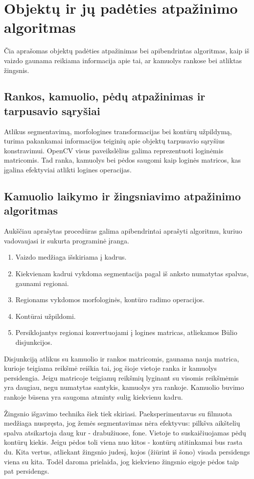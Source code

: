 \documentclass{VUMIFPSkursinis}
\begin{document}
\section{Objektų ir jų padėties atpažinimo algoritmas}
Čia aprašomas objektų padėties atpažinimas bei apibendrintas algoritmas, kaip iš vaizdo gaunama reikiama informacija apie tai, ar kamuolys rankose bei  atliktas žingsnis.
\subsection{Rankos, kamuolio, pėdų  atpažinimas ir tarpusavio sąryšiai}
Atlikus segmentavimą, morfologines transformacijas bei kontūrų užpildymą, turima pakankamai informacijos teiginių apie objektų tarpusavio sąryšius konstravimui.
OpenCV visus paveikslėlius galima reprezentuoti loginėmis matricomis. Tad ranka, kamuolys bei pėdos saugomi kaip loginės matricos, kas įgalina efektyviai atlikti logines operacijas.
\subsection{Kamuolio laikymo ir žingsniavimo atpažinimo algoritmas}
Aukščiau aprašytas procedūras galima apibendrintai aprašyti algoritmu, kuriuo vadovaujasi ir sukurta programinė įranga.
\begin{enumerate}[topsep=5pt,itemsep=-1ex,partopsep=2ex,parsep=2ex]
	\item Vaizdo medžiaga išskiriama į kadrus.  
	\item Kiekvienam kadrui vykdoma segmentacija pagal iš anksto numatytas spalvas, gaunami regionai. 
	\item Regionams vykdomos morfologinės, kontūro radimo operacijos.
	\item Kontūrai užpildomi.
	\item Persiklojantys regionai konvertuojami į logines matricas, atliekamos Būlio disjunkcijos.
\end{enumerate}

Disjunkciją atlikus su kamuolio ir rankos matricomis, gaunama nauja matrica, kurioje teigiama reikšmė reiškia tai, jog šioje vietoje ranka ir kamuolys persidengia. Jeigu matricoje teigiamų reikšmių lyginant su visomis reikšmėmis yra daugiau, negu numatytas santykis, kamuolys yra rankoje. Kamuolio buvimo rankoje būsena yra saugoma atminty sulig kiekvienu kadru.


Žingsnio išgavimo technika šiek tiek skiriasi. Paeksperimentavus su filmuota medžiaga nuspręsta, jog žemės segmentavimas nėra efektyvus: pilkšva aikštelių spalva atsikartoja daug kur - drabužiuose, fone. Vietoje to suskaičiuojamas pėdų kontūrų kiekis. Jeigu pėdos toli viena nuo kitos - kontūrų atitinkamai bus rasta du. Kita vertus, atliekant žingsnio judesį, kojos (žiūrint iš šono) visada persidengs viena su kita. Todėl daroma prielaida, jog kiekvieno žingsnio eigoje pėdos taip pat persidengs.
\end{document}
